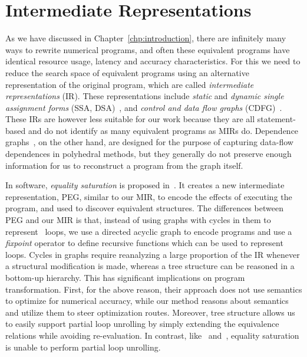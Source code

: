 \section{Intermediate Representations}
\label{bg:sec:intermediate_representations}

As we have discussed in Chapter~\ref{chp:introduction}, there are infinitely
many ways to rewrite numerical programs, and often these equivalent programs
have identical resource usage, latency and accuracy characteristics.  For this
we need to reduce the search space of equivalent programs using an alternative
representation of the original program, which are called \emph{intermediate
representations} (IR).  These representations include \emph{static} and
\emph{dynamic single assignment forms} (SSA, DSA)~\cite{rau92, cytron91},
and \emph{control and data flow graphs} (CDFG)~\cite{gajski94}.  These IRs
are however less suitable for our work because they are all statement-based
and do not identify as many equivalent programs as MIRs do.  Dependence
graphs~\cite{rau94}, on the other hand, are designed for the purpose of
capturing data-flow dependences in polyhedral methods, but they generally do
not preserve enough information for us to reconstruct a program from the graph
itself.

In software, \emph{equality saturation} is proposed in~\cite{tate09}.  It
creates a new intermediate representation, PEG, similar to our MIR, to
encode the effects of executing the program, and used to discover equivalent
structures.  The differences between PEG and our MIR is that, instead of using
graphs with cycles in them to represent \whilelit~loops, we use a directed
acyclic graph to encode programs and use a \emph{fixpoint} operator to define
recursive functions which can be used to represent loops.  Cycles in graphs
require reanalyzing a large proportion of the IR whenever a structural
modification is made, whereas a tree structure can be reasoned in a bottom-up
hierarchy.  This has significant implications on program transformation.
First, for the above reason, their approach does not use semantics to optimize
for numerical accuracy, while our method reasons about semantics and utilize
them to steer optimization routes.  Moreover, tree structure allows us to
easily support partial loop unrolling by simply extending the equivalence
relations while avoiding re-evaluation.  In contrast, like~\cite{martel09}
and~\cite{damouche15}, equality saturation is unable to perform partial loop
unrolling.
